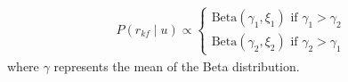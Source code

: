\documentclass[floatsintext,doc]{apa6}
\begin{document}
\begin{eqnarray}
P (r_{kf} \mid u) \propto  \begin{cases}
\text{Beta}(\gamma_1, \xi_1) \text{ if } \gamma_1 > \gamma_2 \\
\text{Beta}(\gamma_2, \xi_2) \text{ if } \gamma_2 > \gamma_1 
 \end{cases} \label{eq:rk}
\end{eqnarray}
\noindent where $\gamma$ represents the mean of the Beta distribution.
%
%
%
%
%
\end{document}
